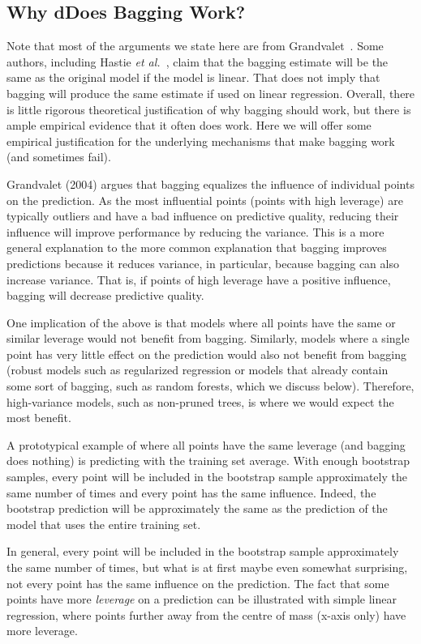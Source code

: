 \begin{refsection}
\subsection*{Why dDoes Bagging Work?}

Note that most of the arguments we state here are from Grandvalet~\cite{Grandvalet2004}. Some authors, including Hastie {\em et al.}~\cite{2016-Hastie}, claim that the bagging estimate will be the same as the original model if the model is linear. That does not imply that bagging will produce the same estimate if used on linear regression. Overall, there is little rigorous theoretical justification of why bagging should work, but there is ample empirical evidence that it often does work. Here we will offer some empirical justification for the underlying mechanisms that make bagging work (and sometimes fail).

Grandvalet (2004) argues that bagging equalizes the influence of individual points on the prediction. As the most influential points (points with high leverage) are typically outliers and have a bad influence on predictive quality, reducing their influence will improve performance by reducing the variance. This is a more general explanation to the more common explanation that bagging improves predictions because it reduces variance, in particular, because bagging can also increase variance. That is, if points of high leverage have a positive influence, bagging will decrease predictive quality.

One implication of the above is that models where all points have the same or similar leverage would not benefit from bagging. Similarly, models where a single point has very little effect on the prediction would also not benefit from bagging (robust models such as regularized regression or models that already contain some sort of bagging, such as random forests, which we discuss below). Therefore, high-variance models, such as non-pruned trees, is where we would expect the most benefit.

A prototypical example of where all points have the same leverage (and bagging does nothing) is predicting with the training set average. With enough bootstrap samples, every point will be included in the bootstrap sample approximately the same number of times and every point has the same influence. Indeed, the bootstrap prediction will be approximately the same as the prediction of the model that uses the entire training set.

In general, every point will be included in the bootstrap sample approximately the same number of times, but what is at first maybe even somewhat surprising, not every point has the same influence on the prediction. The fact that some points have more {\em leverage} on a prediction can be illustrated with simple linear regression, where points further away from the centre of mass (x-axis only) have more leverage. 


\end{refsection}

